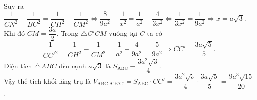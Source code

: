 \documentclass[12pt,a4paper,oneside]{book}
\begin{document}
\begin{ex}
{Suy ra
$\dfrac{1}{CN^2}-\dfrac{1}{BC^2}=\dfrac{1}{CH^2}-\dfrac{1}{CM^2}\Leftrightarrow \dfrac{8}{9a^2}-\dfrac{1}{x^2}=\dfrac{1}{a^2}-\dfrac{4}{3x^2}\Leftrightarrow 
\dfrac{1}{3x^2}=\dfrac{1}{9a^2}\Rightarrow x=a\sqrt{3}.$\\
Khi đó $CM=\dfrac{3a}{2}.$ Trong $\triangle C'CM$ vuông tại $C$ ta có
 $$\dfrac{1}{CC'^2}=\dfrac{1}{CH^2}-\dfrac{1}{CM^2}=\dfrac{1}{a^2}-\dfrac{4}{9a^2}=\dfrac{5}{9a^2}\Rightarrow CC'=\dfrac{3a\sqrt{5}}{5}.$$
Diện tích $\triangle ABC$ đều cạnh $a\sqrt{3}$ là $S_{\text{ABC}}=\dfrac{3a^2\sqrt{3}}{4}$.\\  
Vậy thể tích khối lăng trụ là  $V_{\text{ABC.A'B'C'}}=S_{\text{ABC}}\cdot CC'=\dfrac{3a^2\sqrt{3}}{4}\cdot \dfrac{3a\sqrt{5}}{5}= \dfrac{9a^3\sqrt{15}}{20}$.

}
\end{ex}
\end{document}
